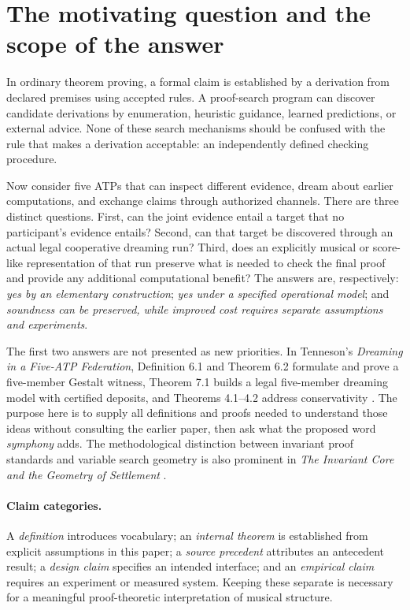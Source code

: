 \documentclass[11pt,letterpaper]{article}
\theoremstyle{definition}
\theoremstyle{remark}
\begin{document}
\section{The motivating question and the scope of the answer}
In ordinary theorem proving, a formal claim is established by a derivation from declared premises using accepted rules. A proof-search program can discover candidate derivations by enumeration, heuristic guidance, learned predictions, or external advice. None of these search mechanisms should be confused with the rule that makes a derivation acceptable: an independently defined checking procedure.

Now consider five ATPs that can inspect different evidence, dream about earlier computations, and exchange claims through authorized channels. There are three distinct questions. First, can the joint evidence entail a target that no participant's evidence entails? Second, can that target be discovered through an actual legal cooperative dreaming run? Third, does an explicitly musical or score-like representation of that run preserve what is needed to check the final proof and provide any additional computational benefit? The answers are, respectively: \emph{yes by an elementary construction}; \emph{yes under a specified operational model}; and \emph{soundness can be preserved, while improved cost requires separate assumptions and experiments}.

The first two answers are not presented as new priorities. In Tenneson's \emph{Dreaming in a Five-ATP Federation}, Definition 6.1 and Theorem 6.2 formulate and prove a five-member Gestalt witness, Theorem 7.1 builds a legal five-member dreaming model with certified deposits, and Theorems 4.1--4.2 address conservativity \cite{tenneson-dreaming}. The purpose here is to supply all definitions and proofs needed to understand those ideas without consulting the earlier paper, then ask what the proposed word \emph{symphony} adds. The methodological distinction between invariant proof standards and variable search geometry is also prominent in \emph{The Invariant Core and the Geometry of Settlement} \cite{tenneson-core}.

\paragraph{Claim categories.} A \emph{definition} introduces vocabulary; an \emph{internal theorem} is established from explicit assumptions in this paper; a \emph{source precedent} attributes an antecedent result; a \emph{design claim} specifies an intended interface; and an \emph{empirical claim} requires an experiment or measured system. Keeping these separate is necessary for a meaningful proof-theoretic interpretation of musical structure.
\end{document}
